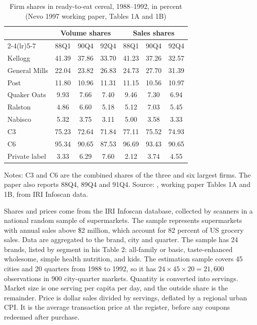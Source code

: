 \begin{table}[htbp]
\centering
\caption{Firm shares in ready-to-eat cereal, 1988--1992, in percent (Nevo 1997 working paper, Tables 1A and 1B)}
\label{tab:11-nevo-shares}
\small
\begin{tabular}{@{}lcccccc@{}}
\toprule
 & \multicolumn{3}{c}{Volume shares} & \multicolumn{3}{c}{Sales shares} \\
\cmidrule(lr){2-4}\cmidrule(lr){5-7}
 & 88Q1 & 90Q4 & 92Q4 & 88Q1 & 90Q4 & 92Q4 \\
\midrule
Kellogg        & 41.39 & 37.86 & 33.70 & 41.23 & 37.26 & 32.57 \\
General Mills  & 22.04 & 23.82 & 26.83 & 24.73 & 27.70 & 31.39 \\
Post           & 11.80 & 10.96 & 11.31 & 11.15 & 10.56 & 10.97 \\
Quaker Oats    &  9.93 &  7.66 &  7.40 &  9.46 &  7.30 &  6.94 \\
Ralston        &  4.86 &  6.60 &  5.18 &  5.12 &  7.03 &  5.45 \\
Nabisco        &  5.32 &  3.75 &  3.11 &  5.00 &  3.58 &  3.33 \\
\midrule
C3             & 75.23 & 72.64 & 71.84 & 77.11 & 75.52 & 74.93 \\
C6             & 95.34 & 90.65 & 87.53 & 96.69 & 93.43 & 90.65 \\
Private label  &  3.33 &  6.29 &  7.60 &  2.12 &  3.74 &  4.55 \\
\bottomrule
\end{tabular}

\smallskip
\begin{minipage}{0.86\linewidth}
\footnotesize
Notes: C3 and C6 are the combined shares of the three and six largest firms. The paper also reports 88Q4, 89Q4 and
91Q4. Source: \citet{Nevo2000b}, working paper Tables 1A and 1B, from IRI Infoscan data.
\end{minipage}
\end{table}

 Shares and prices come from the IRI Infoscan database, collected by scanners in a national random sample
of supermarkets. The sample represents supermarkets with annual sales above \$2 million, which account for 82 percent of
US grocery sales. Data are aggregated to the brand, city and quarter. The sample has 24 brands, listed by segment in his
Table 2: all-family or basic, taste-enhanced wholesome, simple health nutrition, and kids. The estimation sample
covers 45 cities and 20 quarters from 1988 to 1992, so it has $24 \times 45 \times 20 = 21{,}600$ observations in 900
city-quarter markets. Quantity
is converted into servings. Market size is one serving per capita per day, and the outside share is the remainder. Price
is dollar sales divided by servings, deflated by a regional urban CPI. It is the average transaction price at the
register, before any coupons redeemed after purchase.

